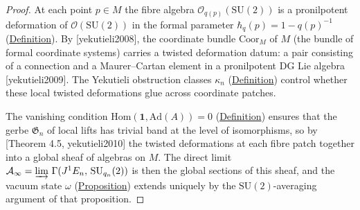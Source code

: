 \begin{proof}
At each point $p \in M$ the fibre algebra
$\mathcal{O}_{q(p)}(\mathrm{SU}(2))$ is a pronilpotent deformation of
$\mathcal{O}(\mathrm{SU}(2))$ in the formal parameter
$\hbar_q(p) = 1 - q(p)^{-1}$
(\hyperref[def:quantum-planck-constant]{Definition}).
By [yekutieli2008], the coordinate bundle $\mathrm{Coor}_M$ of $M$
(the bundle of formal coordinate systems) carries a twisted deformation
datum: a pair consisting of a connection and a Maurer--Cartan element in
a pronilpotent DG Lie algebra [yekutieli2009].  The Yekutieli
obstruction classes $\kappa_n$
(\hyperref[def:quantum-characteristic-classes]{Definition}) control whether
these local twisted deformations glue across coordinate patches.

The vanishing condition
$\mathrm{Hom}(\mathbf{1}, \mathrm{Ad}(A)) = 0$
(\hyperref[def:quantum-observable-universe]{Definition}) ensures that the
gerbe $\mathfrak{G}_n$ of local lifts has trivial band at the level of
isomorphisms, so by [Theorem 4.5, yekutieli2010] the twisted
deformations at each fibre patch together into a global sheaf of
algebras on $M$.  The direct limit $\mathcal{A}_\infty =
\varinjlim\,\Gamma(J^1 E_n,\, \mathrm{SU}_{q_n}(2))$ is then the
global sections of this sheaf, and the vacuum state $\omega$
(\hyperref[prop:vacuum-state]{Proposition}) extends uniquely by the
$\mathrm{SU}(2)$-averaging argument of that proposition.
\end{proof}

